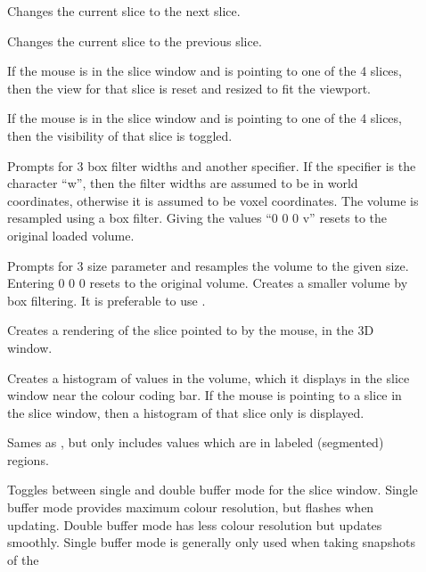 \begin{description}
\item[]  Changes the current slice to the next slice.
\item[]  Changes the current slice to the previous slice.
\item[]  If the mouse is in the slice
   window and is pointing to one of the 4 slices, then the view for
   that slice is reset and resized to fit the viewport.
\item[]  If the mouse is in the slice
   window and is pointing to one of the 4 slices, then the visibility
   of that slice is toggled.
\item[]  Prompts for 3 box filter
       widths and another specifier.  If the specifier is the
       character ``w'', then the
       filter widths are assumed to be in world coordinates, otherwise
       it is assumed to be voxel coordinates.  The volume is resampled
       using a box filter.  Giving the values ``0 0 0 v'' resets to the
       original loaded volume.
\item[]  Prompts for 3 size parameter and
       resamples the volume to the given size.  Entering 0 0 0 resets to
       the original volume.  Creates a smaller volume by box
       filtering.  It is preferable to use .
\item[]  Creates a rendering of the slice
       pointed to by the mouse, in the 3D window.
\item[]  Creates a histogram of
       values in the volume, which it displays in the slice window near
       the colour coding bar.
       If the mouse is pointing to a slice in the slice window, then a
       histogram of that slice only is displayed.
\item[]  Sames as
       , but only includes values
       which are in labeled (segmented) regions.
\item[]  Toggles between single and double buffer
       mode for the slice window.  Single buffer mode provides maximum
       colour resolution, but flashes when updating.  Double buffer
       mode has less colour resolution but updates smoothly.  Single
       buffer mode is generally only used when taking snapshots of the

\end{description}
